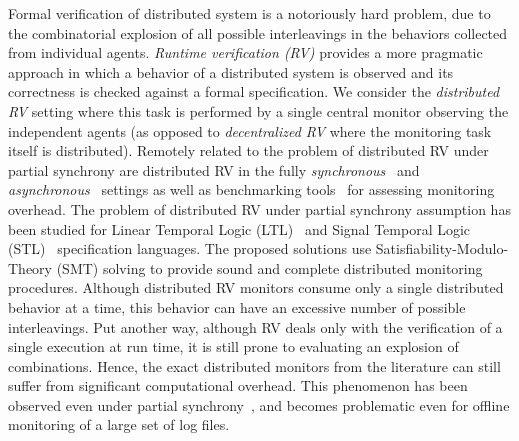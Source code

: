 Formal verification of distributed system is a notoriously hard problem, due to the combinatorial 
explosion of all possible interleavings in the behaviors collected from individual agents.
%
 \emph{Runtime verification (RV)} provides a more pragmatic approach in which a behavior of a distributed system is observed and its correctness is checked against a formal specification.
%
\alert{We consider the \emph{distributed RV} setting where this task is performed by a single central monitor observing the independent agents (as opposed to \emph{decentralized RV} where the monitoring task itself is distributed).}
%
Remotely related to the problem of distributed RV under partial synchrony are distributed RV in the 
fully {\em synchronous}~\cite{ef20,cf16,bf16} and {\em 
asynchronous}~\cite{cgnm13,mg05,og07,mb15,g20,bfrrt22} settings as well as  benchmarking 
tools~\cite{aafi21} for assessing monitoring overhead.
%
The problem of distributed RV under partial synchrony assumption has been studied for Linear 
 Temporal Logic (LTL)~\cite{GangulyMB20} and Signal Temporal Logic (STL)~\cite{MomtazAB23} 
 specification languages.
 The proposed solutions use Satisfiability-Modulo-Theory (SMT) solving to provide sound and 
 complete distributed monitoring procedures.
 Although distributed RV monitors consume only a single distributed behavior at a time, this behavior 
 can have an excessive number of possible interleavings. 
 Put another way, although RV deals only with the verification of a single execution at run time, it is 
 still prone to evaluating an explosion of combinations.
 Hence, the exact distributed monitors from the literature can still suffer from significant 
 computational overhead.
 This phenomenon has been observed even under partial synchrony~\cite{GangulyMB20,gmb24}, \alert{and becomes problematic even for offline monitoring of a large set of log files.}
  

